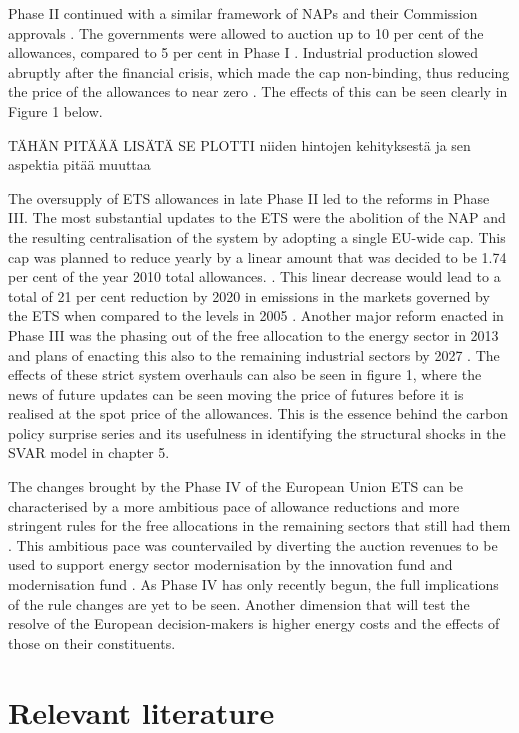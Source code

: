 \documentclass[
  12pt,
  a4paper,
]{report}
\begin{document}
Phase II continued with a similar framework of NAPs and their Commission approvals \citep{ellerman2020}. The governments were allowed to auction up to 10 per cent of the allowances, compared to 5 per cent in Phase I \citep{ellerman2020}. Industrial production slowed abruptly after the financial crisis, which made the cap non-binding, thus reducing the price of the allowances to near zero \citep{verde2019free}. The effects of this can be seen clearly in Figure 1 below.

TÄHÄN PITÄÄÄ LISÄTÄ SE PLOTTI niiden hintojen kehityksestä ja sen aspektia pitää muuttaa

The oversupply of ETS allowances in late Phase II led to the reforms in Phase III. The most substantial updates to the ETS were the abolition of the NAP and the resulting centralisation of the system by adopting a single EU-wide cap. This cap was planned to reduce yearly by a linear amount that was decided to be 1.74 per cent of the year 2010 total allowances. \citep{ellerman2020}. This linear decrease would lead to a total of 21 per cent reduction by 2020 in emissions in the markets governed by the ETS when compared to the levels in 2005 \citep{verde2019free}. Another major reform enacted in Phase III was the phasing out of the free allocation to the energy sector in 2013 and plans of enacting this also to the remaining industrial sectors by 2027 \citep{ellerman2020}. The effects of these strict system overhauls can also be seen in figure 1, where the news of future updates can be seen moving the price of futures before it is realised at the spot price of the allowances. This is the essence behind the carbon policy surprise series and its usefulness in identifying the structural shocks in the SVAR model in chapter 5.

The changes brought by the Phase IV of the European Union ETS can be characterised by a more ambitious pace of allowance reductions and more stringent rules for the free allocations in the remaining sectors that still had them \citep{verde2019free}. This ambitious pace was countervailed by diverting the auction revenues to be used to support energy sector modernisation by the innovation fund and modernisation fund \citep{verde2019free}. As Phase IV has only recently begun, the full implications of the rule changes are yet to be seen. Another dimension that will test the resolve of the European decision-makers is higher energy costs and the effects of those on their constituents.

\hypertarget{rellit}{%
\chapter{Relevant literature}\label{rellit}}
\end{document}
